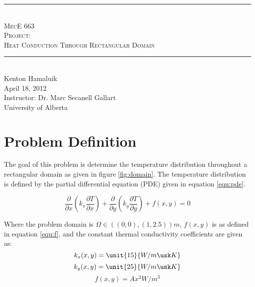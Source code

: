 \documentclass[letterpaper,10pt]{article}
\newcommand{\HRule}{\rule{\linewidth}{0.5mm}}
\begin{document}
\begin{center}
\vspace*{\fill}
\HRule \\[0.5cm]
\textsc{\LARGE MecE 663}\\
\textsc{\Large Project:}\\
\textsc{\large Heat Conduction Through Rectangular Domain}\\[-0.2cm]
\HRule \\[1cm]
Kenton Hamaluik\\[0.5cm]
April 18, 2012\\
Instructor: Dr. Marc Secanell Gallart\\
University of Alberta
\vspace*{\fill}
\end{center}
\pagebreak

\tableofcontents
\pagebreak
\listoffigures
\listoftables
\pagebreak

\pagestyle{fancyplain}
\fancyhf{}
\setcounter{page}{1}

\section{Problem Definition}
\label{sec:definition}
The goal of this problem is determine the temperature distribution throughout a rectangular domain as given in figure \ref{fig:domain}. The temperature distribution is defined by the partial differential equation (PDE) given in equation \ref{equ:pde}.

\begin{equation}
\label{equ:pde}
\frac{\partial}{\partial x}\left(k_x\frac{\partial T}{\partial x}\right) + \frac{\partial}{\partial y}\left(k_y\frac{\partial T}{\partial y}\right) + f(x,y) = 0
\end{equation}

Where the problem domain is $\Omega \in \unit{\left(\left(0,0\right),\left(1,2.5\right)\right)}{m}$, $f(x,y)$ is as defined in equation \ref{equ:f}, and the constant thermal conductivity coefficients are given as:
\[k_x(x,y)=\unit{15}{W/m\usk K}\]
\[k_y(x,y)=\unit{25}{W/m\usk K}\]
\begin{equation}
\label{equ:f}
f(x,y) = Ax^2 \unit{}{W/m^3}
\end{equation}
\end{document}
